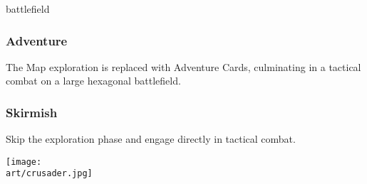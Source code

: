 \begin{multicols*}{2}
\begin{expansion}{battlefield}
\subsubsection*{Adventure}
The Map exploration is replaced with Adventure Cards, culminating in a tactical combat on a large hexagonal battlefield.

\subsubsection*{Skirmish}
Skip the exploration phase and engage directly in tactical combat.
\end{expansion}

\bigskip
\vspace*{\fill}
\texttt{[image: \\art/crusader.jpg]}
\vspace*{\fill}

\end{multicols*}
